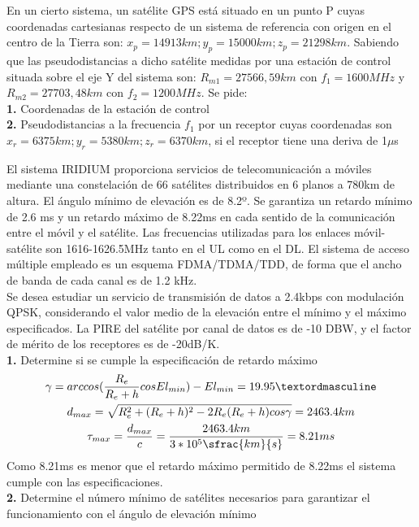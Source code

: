\begin{exercise}[3]
	En un cierto sistema, un satélite GPS está situado en un punto P cuyas coordenadas cartesianas respecto de un sistema de referencia con origen en el centro de la Tierra son: $x_p=14913km;y_p=15000km;z_p=21298km$. Sabiendo que las pseudodistancias a dicho satélite medidas por una estación de control situada sobre el eje Y del sistema son: $R_{m1}=27566,59km$ con $f_1=1600MHz$ y $R_{m2}=27703,48km$ con $f_2=1200MHz$. Se pide:\\
	\textbf{1.} Coordenadas de la estación de control \\
	\textbf{2.} Pseudodistancias a la frecuencia $f_1$ por un receptor cuyas coordenadas son $x_r=6375km;y_r=5380km;z_r=6370km$, si el receptor tiene una deriva de 1$\mu$s
\end{exercise}
\begin{exercise}[4]
	El sistema IRIDIUM proporciona servicios de telecomunicación a móviles mediante una constelación de 66 satélites distribuidos en 6 planos a 780km de altura. El ángulo mínimo de elevación es de 8.2º. Se garantiza un retardo mínimo de 2.6 ms y un retardo máximo de 8.22ms en cada sentido de la comunicación entre el móvil y el satélite. Las frecuencias utilizadas para los enlaces móvil-satélite son 1616-1626.5MHz tanto en el UL como en el DL. El sistema de acceso múltiple empleado es un esquema FDMA/TDMA/TDD, de forma que el ancho de banda de cada canal es de 1.2 kHz.\\
	Se desea estudiar un servicio de transmisión de datos a 2.4kbps con modulación QPSK, considerando el valor medio de la elevación entre el mínimo y el máximo especificados. La PIRE del satélite por canal de datos es de -10 DBW, y el factor de mérito de los receptores es de -20dB/K.\\
	\textbf{1.} Determine si se cumple la especificación de retardo máximo\\
	\begin{gather*}
		\gamma=arccos(\frac{R_e}{R_e+h}cosEl_{min})-El_{min}=19.95º\\
		d_{max}=\sqrt{R_e^2+(R_e+h)^2-2R_e(R_e+h)cos\gamma}=2463.4km\\
		\tau_{max}=\frac{d_{max}}{c}=\frac{2463.4km}{3*10^5\sfrac{km}{s}}=8.21ms
	\end{gather*}
Como 8.21ms es menor que el retardo máximo permitido de 8.22ms el sistema cumple con las especificaciones.\\
	\textbf{2.} Determine el número mínimo de satélites necesarios para garantizar el funcionamiento con el ángulo de elevación mínimo\\

\end{exercise}
